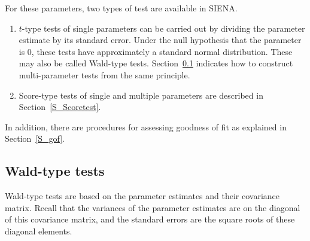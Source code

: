 \documentclass[a4paper,fleqn,11pt]{article}
\newcommand{\+}{\, + \,}
\newcommand{\si}{{\sf SIENA}}
\begin{document}
For these parameters, two types of test are available in \si.

\begin{enumerate}
\item $t$-type tests of single parameters can be carried out by
dividing the parameter estimate by its standard error.
Under the null hypothesis that the parameter is 0,
these tests have approximately a standard normal distribution.
These may also be called Wald-type tests.
Section~\ref{Waldtest} indicates how to construct multi-parameter tests
from the same principle.

\item Score-type tests of single and multiple parameters
      are described in Section~\ref{S_Scoretest}.

\end{enumerate}
In addition, there are procedures for assessing goodness of fit
as explained in Section~\ref{S_gof}.

\subsection{Wald-type tests}
\label{Waldtest}

Wald-type tests are based on the parameter estimates
and their covariance matrix.
Recall that the variances of the parameter estimates
are on the diagonal of this covariance matrix, and
the standard errors are the square roots of these diagonal
elements.
\end{document}
